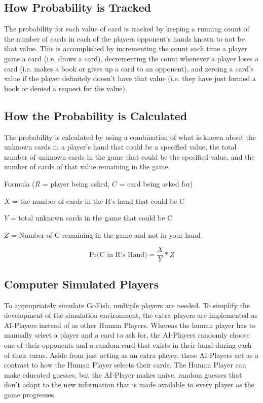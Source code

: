 \documentclass[preprint,12pt]{elsarticle}
\begin{document}
\subsection{How Probability is Tracked}

The probability for each value of card is tracked by keeping a running count of the number of cards in each of the players opponent's hands known to not be that value. This is accomplished by incrementing the count each time a player gains a card (i.e. draws a card), decrementing the count whenever a player loses a card (i.e. makes a book or gives up a card to an opponent), and zeroing a card’s value if the player definitely doesn’t have that value (i.e. they have just formed a book or denied a request for the value). 

\subsection{How the Probability is Calculated}

The probability is calculated by using a combination of what is known about the unknown cards in a player’s hand that could be a specified value, the total number of unknown cards in the game that could be the specified value, and the number of cards of that value remaining in the game.
\vspace{5 mm}

\noindent Formula ($R$ = player being asked, $C$ = card being asked for)

\noindent$X$ = the number of cards in the R's hand that could be C

\noindent$Y$ = total unknown cards in the game that could be C

\noindent$Z$ = Number of C remaining in the game and not in your hand


\begin{equation}
\label{Probability}
\mbox{Pr(C in R’s Hand)} = \frac{X}Y * Z
\end{equation}


\subsection{Computer Simulated Players}

To appropriately simulate GoFish, multiple players are needed. To simplify the development of the simulation environment, the extra players are implemented as AI-Players instead of as other Human Players. Whereas the human player has to manually select a player and a card to ask for, the AI-Players randomly choose one of their opponents and a random card that exists in their hand during each of their turns. Aside from just acting as an extra player, these AI-Players act as a contrast to how the Human Player selects their cards. The Human Player can make educated guesses, but the AI-Player makes naive, random guesses that don’t adapt to the new information that is made available to every player as the game progresses. 
\end{document}
